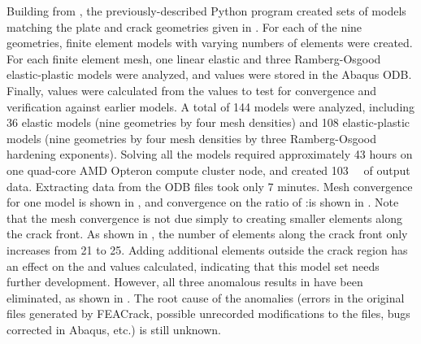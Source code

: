 %
%
Building from \citet{renfro2009}, the previously-described Python program created sets of models matching the plate and crack geometries given in .
For each of the nine geometries, finite element models with varying numbers of elements were created.
For each finite element mesh, one linear elastic and three Ramberg-Osgood elastic-plastic models were analyzed, and \J values were stored in the Abaqus ODB.
Finally, \hone values were calculated from the \J values to test for convergence and verification against earlier models.
A total of 144 models were analyzed, including 36 elastic models (nine geometries by four mesh densities) and 108 elastic-plastic models (nine geometries by four mesh densities by three Ramberg-Osgood hardening exponents).
Solving all the models required approximately 43 hours on one quad-core AMD Opteron compute cluster node, and created \SI{103}{\giga\byte} of output data. Extracting \hone data from the ODB files took only 7 minutes.
Mesh convergence for one model is shown in , and convergence on the ratio of \Jpl:\Jel is shown in .
Note that the mesh convergence is not due simply to creating smaller elements along the crack front.
As shown in , the number of elements along the crack front only increases from 21 to 25.
Adding additional elements outside the crack region has an effect on the \J and \hone values calculated, indicating that this model set needs further development.
However, all three anomalous \hone results in \citet{quillen2005} have been eliminated, as shown in .
The root cause of the anomalies (errors in the original files generated by FEACrack, possible unrecorded modifications to the files, bugs corrected in Abaqus, etc.) is still unknown.
